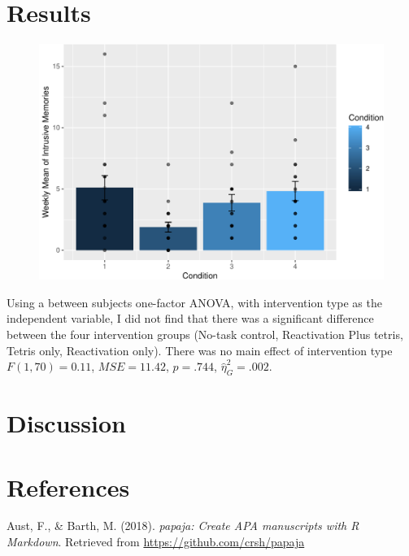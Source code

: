 \documentclass[man]{apa6}
\begin{document}
\section{Results}\label{results}

\begin{figure}
\centering
\includegraphics{Midterm_Paper_files/figure-latex/unnamed-chunk-1-1.pdf}
\caption{}
\end{figure}

Using a between subjects one-factor ANOVA, with intervention type as the
independent variable, I did not find that there was a significant
difference between the four intervention groups (No-task control,
Reactivation Plus tetris, Tetris only, Reactivation only). There was no
main effect of intervention type \(F(1, 70) = 0.11\),
\(\mathit{MSE} = 11.42\), \(p = .744\), \(\hat{\eta}^2_G = .002\).

\section{Discussion}\label{discussion}

\newpage

\section{References}\label{references}

\begingroup
\setlength{\parindent}{-0.5in} \setlength{\leftskip}{0.5in}

\hypertarget{refs}{}
\hypertarget{ref-R-papaja}{}
Aust, F., \& Barth, M. (2018). \emph{papaja: Create APA manuscripts with
R Markdown}. Retrieved from \url{https://github.com/crsh/papaja}
\end{document}
